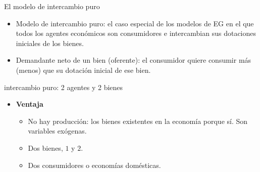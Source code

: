 \begin{frame}{El modelo de intercambio puro}
	\begin{itemize}
		\item 	Modelo de intercambio puro: el caso especial de los modelos de EG en el que todos los agentes económicos son consumidores e intercambian sus dotaciones iniciales de los bienes.
		\item Demandante neto de un bien (oferente): el consumidor quiere consumir más (menos) que su dotación inicial de ese bien.
	\end{itemize}
\end{frame}
\begin{frame}{intercambio puro: 2 agentes y 2 bienes}
	\begin{itemize}
		\item \textbf{Ventaja}
		\begin{itemize}
			\item No hay producción: los bienes existentes en la economía porque sí. Son variables exógenas.
			\item Dos bienes, $1$ y $2$.
			\item Dos consumidores o economías domésticas.
		\end{itemize}
	\end{itemize}
\end{frame}
